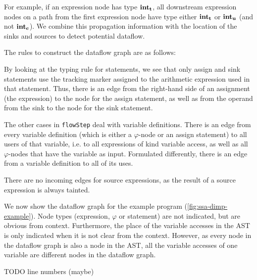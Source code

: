 For example, if an expression node has type $\textbf{int}_\textbf{t}$,
all downstream expression nodes on a path from the first expression node 
have type either $\textbf{int}_\textbf{t}$ or $\textbf{int}_\textbf{u}$ (and not $\textbf{int}_\textbf{c}$).
We combine this propagation information with the location of the sinks and sources 
to detect potential dataflow.

The rules to construct the dataflow graph are as follows:

By looking at the typing rule for statements, we see that only assign and sink statements
use the tracking marker assigned to the arithmetic expression used in that statement.
Thus, there is an edge from the right-hand side of an assignment (the expression) 
to the node for the assign statement, as well as from the operand from the sink 
to the node for the sink statement.

The other cases in \texttt{flowStep} deal with variable definitions.
There is an edge from every variable definition (which is either a $\varphi$-node or 
an assign statement) to all users of that variable, i.e. to all expressions of kind
variable access, as well as all $\varphi$-nodes that have the variable as input.
Formulated differently, there is an edge from a variable definition to all of its uses.

There are no incoming edges for source expressions, as the result of a source expression
is always tainted.

We now show the dataflow graph for the example program (\autoref{fig:ssa-dimp-example}).
Node types (expression, $\varphi$ or statement) are not indicated, but are obvious from context.
Furthermore, the place of the variable accesses in the AST is only indicated when it is 
not clear from the context.
However, as every node in the dataflow graph is also a node in the AST, all the variable accesses
of one variable are different nodes in the dataflow graph.

TODO line numbers (maybe)


